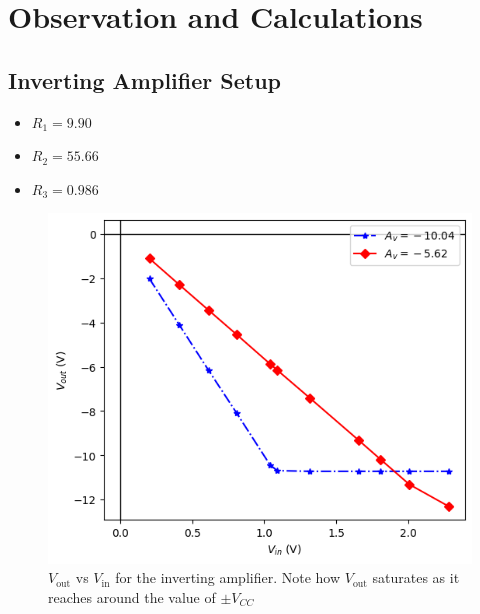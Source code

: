 \section{Observation and Calculations}

\subsection{Inverting Amplifier Setup}
    \begin{itemize}
        \item $R_{1}=9.90$ \kohm
        \item $R_{2}=55.66$ \kohm
        \item $R_{3}=0.986$ \kohm
    \end{itemize}
    
    \begin{figure}[H]
        \centering
        \includegraphics[width=1\columnwidth]{images/ga.png}
        \caption{$V_\text{out}$ vs $V_\text{in}$ for the inverting amplifier. Note how $V_\text{out}$ saturates as it reaches around the value of $\pm V_{CC}$}
        \label{g1}
    \end{figure}
    

